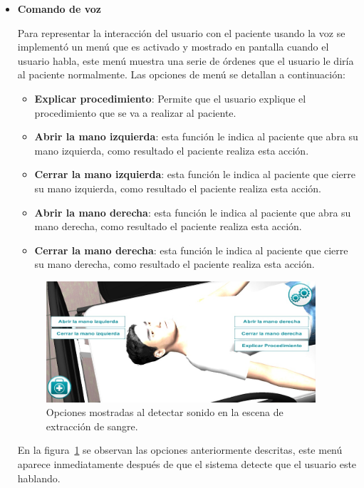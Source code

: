 \begin{itemize}
\item{\textbf{Comando de voz}}

Para representar la interacción del usuario con el paciente usando la voz se
implementó un menú que es activado y mostrado en pantalla cuando el usuario
habla, este menú muestra una serie de órdenes que el usuario le diría al
paciente normalmente. Las opciones de menú se detallan a continuación:

\begin{itemize}
    \item \textbf{Explicar procedimiento}: Permite que el usuario explique el
        procedimiento que se va a realizar al paciente. 
\item \textbf{Abrir la mano izquierda}: esta función le indica al paciente que
    abra su mano izquierda, como resultado el paciente realiza esta acción.
\item \textbf{Cerrar la mano izquierda}: esta función le indica al paciente que
    cierre su mano izquierda, como resultado el paciente realiza esta acción.
\item \textbf{Abrir la mano derecha}: esta función le indica al paciente que
    abra su mano derecha, como resultado el paciente realiza esta acción.
\item \textbf{Cerrar la mano derecha}: esta función le indica al paciente que
    cierre su mano derecha, como resultado el paciente realiza esta acción.
\end{itemize}

\begin{figure}[H]
\centering
\includegraphics[width=10cm]{solucion/images/hemocultivo_comando_voz.jpg}
\caption{Opciones mostradas al detectar sonido en la escena de extracción
    de sangre.}
\label{fig:hemocultivo_voz_gui}
\end{figure}

En la figura~\ref{fig:hemocultivo_voz_gui} se observan las opciones anteriormente
descritas, este menú aparece inmediatamente después de que el sistema detecte
que el usuario este hablando.


\end{itemize}
